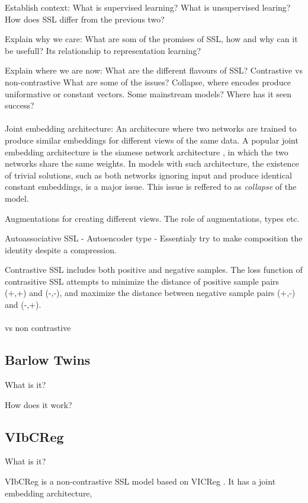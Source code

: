 \documentclass[../../thesis.tex]{subfiles}
\begin{document}
Establish context:
What is supervised learning? 
What is unsupervised learing?
How does SSL differ from the previous two?

Explain why we care:
What are som of the promises of SSL, how and why can it be usefull?
Its relationship to representation learning?

Explain where we are now:
What are the different flavours of SSL? Contrastive vs non-contrastive
What are some of the issues? Collapse, where encodes produce uniformative or constant vectors.
Some mainstream models? 
Where has it seen success?\\\\

Joint embedding architecture: An architecure where two networks are trained to produce similar embeddings for different views of the same data. A popular joint embedding architecture is the siamese network architecture \cite{siamese}, in which the two networks share the same weights. In models with such architecture, the existence of trivial solutions, such as both networks ignoring input and produce identical constant embeddings, is a major issue. This issue is reffered to as \textit{collapse} of the model.

Augmentations for creating different views. The role of augmentations, types etc. 


Autoassociative SSL - Autoencoder type - Essentialy try to make composition the identity despite a compression. 

Contrastive SSL includes both positive and negative samples. The loss function of contrasitive SSL attempts to minimize the distance of positive sample pairs (+,+) and (-,-), and maximize the distance between negative sample pairs (+,-) and (-,+).\\\\

vs non contrastive


\subsection{Barlow Twins}
What is it?

How does it work?

\subsection{VIbCReg}
What is it?

VIbCReg \cite{lee2024vibcreg} is a non-contrastive SSL model based on VICReg \cite{bardes2022vicreg}. It has a joint embedding architecture,
\end{document}
